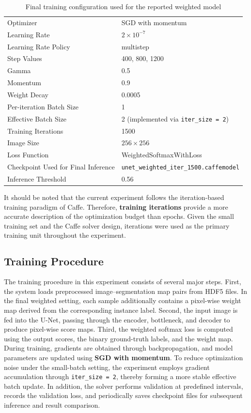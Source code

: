 \documentclass[11pt]{article}
\begin{document}
\begin{table}[H]
\centering
\caption{Final training configuration used for the reported weighted model}
\begin{tabular}{ll}
\toprule
Optimizer & SGD with momentum \\
Learning Rate & $2\times10^{-7}$ \\
Learning Rate Policy & multistep \\
Step Values & 400, 800, 1200 \\
Gamma & 0.5 \\
Momentum & 0.9 \\
Weight Decay & 0.0005 \\
Per-iteration Batch Size & 1 \\
Effective Batch Size & 2 (implemented via \texttt{iter\_size = 2}) \\
Training Iterations & 1500 \\
Image Size & $256 \times 256$ \\
Loss Function & WeightedSoftmaxWithLoss \\
Checkpoint Used for Final Inference & \texttt{unet\_weighted\_iter\_1500.caffemodel} \\
Inference Threshold & 0.56 \\
\bottomrule
\end{tabular}
\end{table}

It should be noted that the current experiment follows the iteration-based training paradigm of Caffe. Therefore, \textbf{training iterations} provide a more accurate description of the optimization budget than epochs. Given the small training set and the Caffe solver design, iterations were used as the primary training unit throughout the experiment.

\subsection{Training Procedure}

The training procedure in this experiment consists of several major steps. First, the system loads preprocessed image--segmentation map pairs from HDF5 files. In the final weighted setting, each sample additionally contains a pixel-wise weight map derived from the corresponding instance label. Second, the input image is fed into the U-Net, passing through the encoder, bottleneck, and decoder to produce pixel-wise score maps. Third, the weighted softmax loss is computed using the output scores, the binary ground-truth labels, and the weight map. During training, gradients are obtained through backpropagation, and model parameters are updated using \textbf{SGD with momentum}. To reduce optimization noise under the small-batch setting, the experiment employs gradient accumulation through \texttt{iter\_size = 2}, thereby forming a more stable effective batch update. In addition, the solver performs validation at predefined intervals, records the validation loss, and periodically saves checkpoint files for subsequent inference and result comparison.
\end{document}
